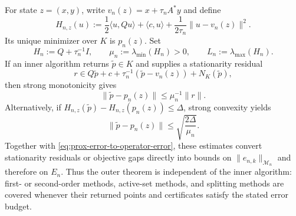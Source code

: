 \documentclass[letterpaper]{article} %
\theoremstyle{definition}
\theoremstyle{remark}
\begin{document}
For state $z=(x,y)$, write $v_n(z)=x+\tau_nA^*y$ and define
\begin{equation}
\label{eq:theory-inner-objective}
    H_{n,z}(u)
    :=
    \frac12\langle u,Qu\rangle+\langle c,u\rangle
    +\frac{1}{2\tau_n}\|u-v_n(z)\|^2.
\end{equation}
Its unique minimizer over $K$ is $p_n(z)$.  Set
\[
    H_n:=Q+\tau_n^{-1}I,
    \qquad
    \mu_n:=\lambda_{\min}(H_n)>0,
    \qquad
    L_n:=\lambda_{\max}(H_n).
\]
If an inner algorithm returns $\widetilde p\in K$ and supplies a stationarity
residual
\begin{equation}
\label{eq:general-stationarity-residual}
    r
    \in
    Q\widetilde p+c+\tau_n^{-1}(\widetilde p-v_n(z))
    +N_K(\widetilde p),
\end{equation}
then strong monotonicity gives
\begin{equation}
\label{eq:general-residual-to-error}
    \|\widetilde p-p_n(z)\|
    \le
    \mu_n^{-1}\|r\|.
\end{equation}
Alternatively, if
$H_{n,z}(\widetilde p)-H_{n,z}(p_n(z))\le\Delta$, strong convexity yields
\[
    \|\widetilde p-p_n(z)\|
    \le
    \sqrt{\frac{2\Delta}{\mu_n}}.
\]
Together with \eqref{eq:prox-error-to-operator-error}, these estimates convert
stationarity residuals or objective gaps directly into bounds on
$\|e_{n,k}\|_{\mathcal M_n}$ and therefore on $E_n$.  Thus the outer theorem
is independent of the inner algorithm: first- or second-order methods,
active-set methods, and splitting methods are covered whenever their returned
points and certificates satisfy the stated error budget.
\end{document}
